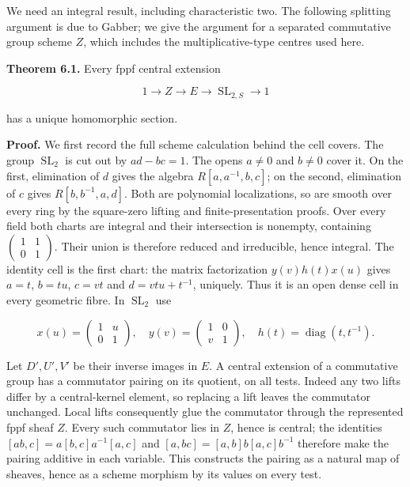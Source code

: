 \documentclass[11pt,a4paper,openany]{report}
\newcounter{none}
\begin{document}
We need an integral result, including characteristic two. The following splitting argument is due to Gabber; we give the argument for a separated commutative group scheme \(Z\), which includes the multiplicative-type centres used here.

\textbf{Theorem 6.1.} Every fppf central extension

\[
1\longrightarrow Z\longrightarrow E\longrightarrow\operatorname{SL}_{2,S}\longrightarrow1
\]

has a unique homomorphic section.

\textbf{Proof.} We first record the full scheme calculation behind the cell covers. The group \(\operatorname{SL}_2\) is cut out by \(ad-bc=1\). The opens \(a\ne0\) and \(b\ne0\) cover it. On the first, elimination of \(d\) gives the algebra \(R[a,a^{-1},b,c]\); on the second, elimination of \(c\) gives \(R[b,b^{-1},a,d]\). Both are polynomial localizations, so are smooth over every ring by the square-zero lifting and finite-presentation proofs. Over every field both charts are integral and their intersection is nonempty, containing \(\left(\begin{smallmatrix}1&1\\0&1\end{smallmatrix}\right)\). Their union is therefore reduced and irreducible, hence integral. The identity cell is the first chart: the matrix factorization \(y(v)h(t)x(u)\) gives \(a=t\), \(b=tu\), \(c=vt\) and \(d=vtu+t^{-1}\), uniquely. Thus it is an open dense cell in every geometric fibre. In \(\operatorname{SL}_2\) use

\[
x(u)=\begin{pmatrix}1&u\\0&1\end{pmatrix},\quad
y(v)=\begin{pmatrix}1&0\\v&1\end{pmatrix},\quad
h(t)=\operatorname{diag}(t,t^{-1}).
\]

Let \(D',U',V'\) be their inverse images in \(E\). A central extension of a commutative group has a commutator pairing on its quotient, on all tests. Indeed any two lifts differ by a central-kernel element, so replacing a lift leaves the commutator unchanged. Local lifts consequently glue the commutator through the represented fppf sheaf \(Z\). Every such commutator lies in \(Z\), hence is central; the identities \([ab,c]=a[b,c]a^{-1}[a,c]\) and \([a,bc]=[a,b]b[a,c]b^{-1}\) therefore make the pairing additive in each variable. This constructs the pairing as a natural map of sheaves, hence as a scheme morphism by its values on every test.
\end{document}
